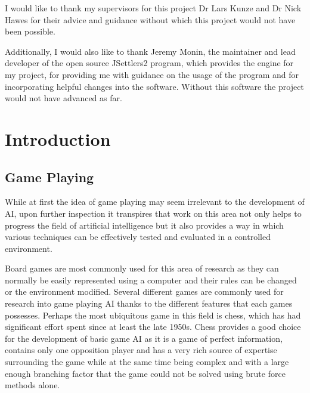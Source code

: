 \documentclass[]{article}
\let\oldsection\section
\renewcommand\section{\clearpage\oldsection}
\newenvironment{changemargin}[2]{%
\begin{list}{}{%
\setlength{\topsep}{0pt}%
\setlength{\leftmargin}{#1}%
\setlength{\rightmargin}{#2}%
\setlength{\listparindent}{\parindent}%
\setlength{\itemindent}{\parindent}%
\setlength{\parsep}{\parskip}%
}%
\item[]}{\end{list}}
\begin{document}
\begin{changemargin}{1.8cm}{1.8cm}

I would like to thank my supervisors for this project Dr Lars Kunze and Dr Nick Hawes for their advice and guidance without which this project would not have been possible.

\vspace{0.2cm}

Additionally, I would also like to thank Jeremy Monin, the maintainer and lead developer of the open source JSettlers2 program, which provides the engine for my project, for providing me with guidance on the usage of the program and for incorporating helpful changes into the software. Without this software the project would not have advanced as far.


\end{changemargin}

\tableofcontents

\pagebreak


\section{Introduction}
\subsection{Game Playing}
 While at first the idea of game playing may seem irrelevant to the development of AI, upon further inspection it transpires that work on this area not only helps to progress the field of artificial intelligence but it also provides a way in which various techniques can be effectively tested and evaluated in a controlled environment.

\par Board games are most commonly used for this area of research as they can normally be easily represented using a computer and their rules can be changed or the environment modified. Several different games are commonly used for research into game playing AI thanks to the different features that each games possesses. Perhaps the most ubiquitous game in this field is chess, which has had significant effort spent since at least the late 1950s. Chess provides a good choice for the development of basic game AI as it is a game of perfect information, contains only one opposition player and has a very rich source of expertise surrounding the game while at the same time being complex and with a large enough branching factor that the game could not be solved using brute force methods alone.
\end{document}
